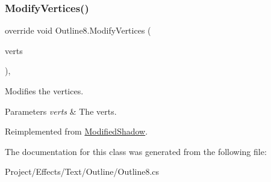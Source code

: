 \subsubsection{\texorpdfstring{Modify\+Vertices()}{ModifyVertices()}}
{\footnotesize\ttfamily override void Outline8.\+Modify\+Vertices (\begin{DoxyParamCaption}\item[{List$<$ U\+I\+Vertex $>$}]{verts }\end{DoxyParamCaption})\hspace{0.3cm}{\ttfamily [inline]}, {\ttfamily [virtual]}}



Modifies the vertices. 


\begin{DoxyParams}{Parameters}
{\em verts} & The verts.\\
\hline
\end{DoxyParams}


Reimplemented from \hyperlink{class_modified_shadow_ac1651effd229c1fd2f454eccc2cf225c}{Modified\+Shadow}.



The documentation for this class was generated from the following file\+:\begin{DoxyCompactItemize}
\item 
Project/\+Effects/\+Text/\+Outline/Outline8.\+cs\end{DoxyCompactItemize}
